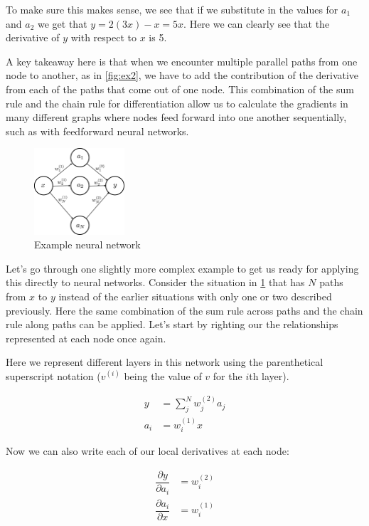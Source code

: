 \documentclass{article}
\begin{document}
To make sure this makes sense, we see that if we substitute in the values for $a_1$ and $a_2$ we get that $y=2(3x) - x = 5x$. Here we can clearly see that the derivative of $y$ with respect to $x$ is 5.

A key takeaway here is that when we encounter multiple parallel paths from one node to another, as in \ref{fig:ex2}, we have to add the contribution of the derivative from each of the paths that come out of one node. This combination of the sum rule and the chain rule for differentiation allow us to calculate the gradients in many different graphs where nodes feed forward into one another sequentially, such as with feedforward neural networks.

\begin{figure}[h]
\centering
\includegraphics[width=0.3\textwidth]{./neural_networks_gradients_ex3.eps}
\caption{Example neural network}
\label{fig:ex3}
\end{figure}

Let's go through one slightly more complex example to get us ready for applying this directly to neural networks. Consider the situation in \ref{fig:ex3} that has $N$ paths from $x$ to $y$ instead of the earlier situations with only one or two described previously. Here the same combination of the sum rule across paths and the chain rule along paths can be applied. Let's start by righting our the relationships represented at each node once again.

Here we represent different layers in this network using the parenthetical superscript notation ($v^{(i)}$ being the value of $v$ for the $i$th layer).

\begin{align}
    y &= \sum\limits_j^N w_j^{(2)} a_j \\
    a_i &= w_i^{(1)} x
\end{align}

Now we can also write each of our local derivatives at each node:

\begin{align}
    \dfrac{\partial y}{\partial a_i} &= w_i^{(2)} \\
    \dfrac{\partial a_i}{\partial x} &= w_i^{(1)} \\
\end{align}
\end{document}
